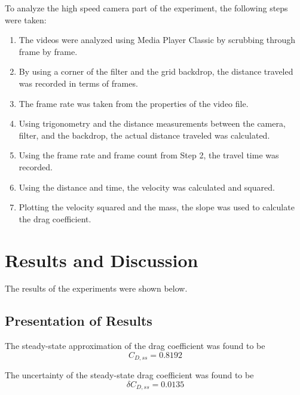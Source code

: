 \documentclass[12pt]{report}
\begin{document}
\noindent To analyze the high speed camera part of the experiment, the following steps were taken:
\begin{enumerate}
	\item The videos were analyzed using Media Player Classic by scrubbing through frame by frame. 
	\item By using a corner of the filter and the grid backdrop, the distance traveled was recorded in terms of frames.
	\item The frame rate was taken from the properties of the video file.
	\item Using trigonometry and the distance measurements between the camera, filter, and the backdrop, the actual distance traveled was calculated. 
	\item Using the frame rate and frame count from Step 2, the travel time was recorded.
	\item Using the distance and time, the velocity was calculated and squared.
	\item Plotting the velocity squared and the mass, the slope was used to calculate the drag coefficient.
\end{enumerate}

\newpage
\section*{Results and Discussion}

The results of the experiments were shown below.

\subsection*{Presentation of Results}

The steady-state approximation of the drag coefficient was found to be
\begin{equation*}
	C_{D,ss} = 0.8192
\end{equation*}

\noindent The uncertainty of the steady-state drag coefficient was found to be
\begin{equation*}
	\delta C_{D,ss} = 0.0135
\end{equation*}
\end{document}
